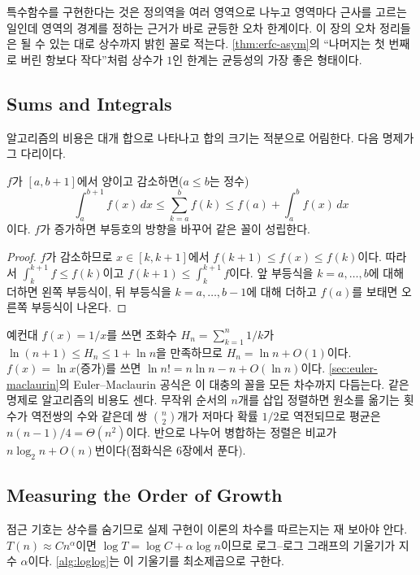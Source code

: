 특수함수를 구현한다는 것은 정의역을 여러 영역으로 나누고 영역마다 근사를 고르는 일인데 영역의 경계를 정하는 근거가 바로 균등한 오차 한계이다. 이 장의 오차 정리들은 될 수 있는 대로 상수까지 밝힌 꼴로 적는다. \cref{thm:erfc-asym}의 ``나머지는 첫 번째로 버린 항보다 작다''처럼 상수가 $1$인 한계는 균등성의 가장 좋은 형태이다.

\subsection{Sums and Integrals}

알고리즘의 비용은 대개 합으로 나타나고 합의 크기는 적분으로 어림한다. 다음 명제가 그 다리이다.

\begin{proposition}
\label{prop:sum-integral}
$f$가 $[a,b+1]$에서 양이고 감소하면($a\le b$는 정수)
\[
\int_a^{b+1}f(x)\,dx\le\sum_{k=a}^bf(k)\le f(a)+\int_a^bf(x)\,dx
\]
이다. $f$가 증가하면 부등호의 방향을 바꾸어 같은 꼴이 성립한다.
\end{proposition}

\begin{proof}
$f$가 감소하므로 $x\in[k,k+1]$에서 $f(k+1)\le f(x)\le f(k)$이다. 따라서 $\int_k^{k+1}f\le f(k)$이고 $f(k+1)\le\int_k^{k+1}f$이다. 앞 부등식을 $k=a,\dots,b$에 대해 더하면 왼쪽 부등식이, 뒤 부등식을 $k=a,\dots,b-1$에 대해 더하고 $f(a)$를 보태면 오른쪽 부등식이 나온다.
\end{proof}

예컨대 $f(x)=1/x$를 쓰면 조화수 $H_n=\sum_{k=1}^n1/k$가 $\ln(n+1)\le H_n\le1+\ln n$을 만족하므로 $H_n=\ln n+O(1)$이다. $f(x)=\ln x$(증가)를 쓰면 $\ln n!=n\ln n-n+O(\ln n)$이다. \cref{sec:euler-maclaurin}의 Euler--Maclaurin 공식은 이 대충의 꼴을 모든 차수까지 다듬는다. 같은 명제로 알고리즘의 비용도 센다. 무작위 순서의 $n$개를 삽입 정렬하면 원소를 옮기는 횟수가 역전쌍의 수와 같은데 쌍 $\binom n2$개가 저마다 확률 $1/2$로 역전되므로 평균은 $n(n-1)/4=\Theta(n^2)$이다. 반으로 나누어 병합하는 정렬은 비교가 $n\log_2n+O(n)$번이다(점화식은 6장에서 푼다).

\subsection{Measuring the Order of Growth}

점근 기호는 상수를 숨기므로 실제 구현이 이론의 차수를 따르는지는 재 보아야 안다. $T(n)\approx Cn^\alpha$이면 $\log T=\log C+\alpha\log n$이므로 로그–로그 그래프의 기울기가 지수 $\alpha$이다. \cref{alg:loglog}는 이 기울기를 최소제곱으로 구한다.

